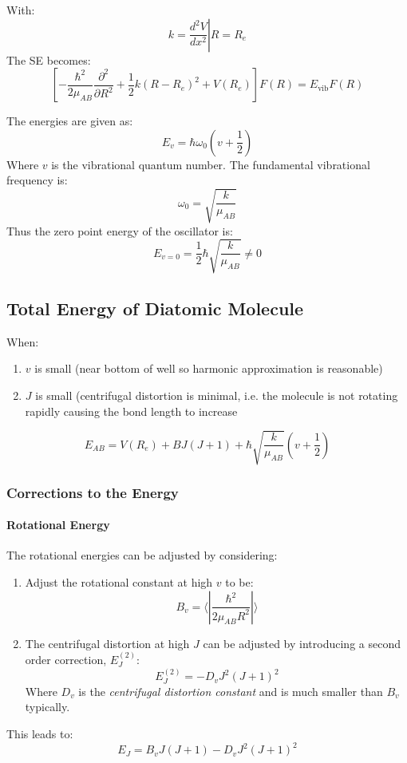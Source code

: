 \documentclass[12pt]{article}
\begin{document}
With:
\[k = \left.\frac{d^2V}{dx^2}\right|R=R_e\]
The SE becomes:
\[\left[ -\frac{\hbar^2}{2\mu_{AB}}\frac{\partial^2}{\partial R^2} + \frac12 k(R-R_e)^2 + V(R_e)\right] F(R) = E_\text{vib}F(R)\]

The energies are given as:
\[E_v = \hbar \omega_0(v+\frac12)\]
Where $v$ is the vibrational quantum number. The fundamental vibrational frequency is:
\[\omega_0 = \sqrt{\frac{k}{\mu_{AB}}}\]
Thus the zero point energy of the oscillator is:
\[E_{v=0} = \frac12\hbar\sqrt{\frac{k}{\mu_{AB}}} \neq 0\]


\subsection{Total Energy of Diatomic Molecule}

When:
\begin{enumerate}
    \item $v$ is small (near bottom of well so harmonic approximation is reasonable)
    \item $J$ is small (centrifugal distortion is minimal, i.e. the molecule is not rotating rapidly causing the bond length to increase
\end{enumerate}
\[ E_{AB} = V(R_e) + BJ(J+1) + \hbar\sqrt{\frac{k}{\mu_{AB}}}(v+\frac12)\]

\subsubsection{Corrections to the Energy}

\paragraph{Rotational Energy}
The rotational energies can be adjusted by considering:

\begin{enumerate}[i]
    \item Adjust the rotational constant at high $v$ to be:
    \[B_v = \langle|\frac{\hbar^2}{2\mu_{AB}R^2}|\rangle\]
    \item The centrifugal distortion at high $J$ can be adjusted by introducing a second order correction, $E_J^(2)$:
    \[ E_J^{(2)} = -D_vJ^2(J+1)^2\]
    Where $D_v$ is the \textit{centrifugal distortion constant} and is much smaller than $B_v$ typically.
\end{enumerate}

This leads to:
\[E_J = B_vJ(J+1) - D_vJ^2(J+1)^2\]
\end{document}
